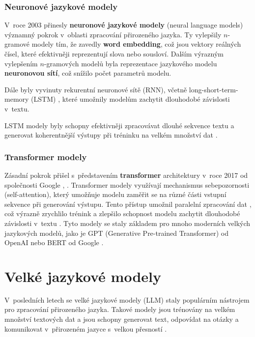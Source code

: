 \documentclass[czech, bc, kiv, he, iso690numb, pdf]{fasthesis}
\begin{document}
\subsection{Neuronové jazykové modely}
V~roce 2003 přinesly \textbf{neuronové jazykové modely} (neural language models) \cite{neural-probabilistic-lm} významný pokrok v~oblasti zpracování přirozeného jazyka. Ty vylepšily $n$-gramové modely tím, že zavedly \textbf{word embedding}, což jsou vektory reálných čísel, které efektivněji reprezentují slova nebo sousloví. Dalším výrazným vylepšením $n$-gra\-mových modelů byla reprezentace jazykového modelu \textbf{neuronovou sítí}, což snížilo počet parametrů modelu.

Dále byly vyvinuty rekurentní neuronové sítě (RNN), včetně long-short-term-memory (LSTM) \cite{llm-past-present-future}, které umožnily modelům zachytit dlouhodobé závislosti v~textu. 

LSTM modely byly schopny efektivněji zpracovávat dlouhé sekvence textu a generovat koherentnější výstupy při tréninku na velkém množství dat \cite{llm-past-present-future}.

\subsection{Transformer modely}
Zásadní pokrok přišel s~představením \textbf{transformer} architektury \cite{llm-past-present-future} v~roce 2017 od společnosti Google \cite{attention-is-all-you-need}, \cite{great-transformer}. Transformer modely využívají mechanismus sebepozornosti (self-attention), který umožňuje modelu zaměřit se na různé části vstupní sekvence při generování výstupu. Tento přístup umožnil paralelní zpracování dat \cite{great-transformer}, což výrazně zrychlilo trénink a zlepšilo schopnost modelu zachytit dlouhodobé závislosti v~textu \cite{llm-past-present-future}. Tyto modely se staly základem pro mnoho moderních velkých jazykových modelů, jako je GPT (Generative Pre-trained Transformer) od OpenAI nebo BERT od Google \cite{great-transformer}.



\chapter{Velké jazykové modely}
V~posledních letech se velké jazykové modely (LLM) staly populárním nástrojem pro zpracování přirozeného jazyka. Takové modely jsou trénovány na velkém množství textových dat a jsou schopny generovat text, odpovídat na otázky a komunikovat v~přirozeném jazyce s~velkou přesností \cite{chat-gpt-llm-education}. 
\end{document}
